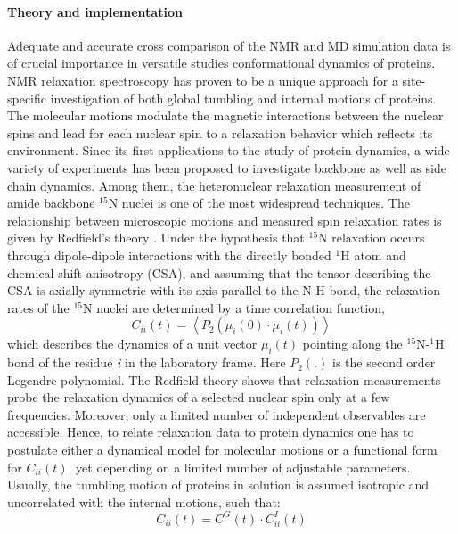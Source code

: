 \documentclass[a4paper,11pt]{article}
\begin{document}
\paragraph{Theory and implementation\\}
\label{op_theory}
Adequate and accurate cross comparison of the NMR and \gls{MD} simulation data is of crucial importance in versatile studies
conformational dynamics of proteins. NMR relaxation spectroscopy has proven to be a unique approach for a site-specific
investigation of both global tumbling and internal motions of proteins. The molecular motions modulate the magnetic 
interactions between the nuclear spins and lead for each nuclear spin to a relaxation behavior which reflects its environment. 
Since its first applications to the study of protein dynamics, a wide variety of experiments has been proposed to 
investigate backbone as well as side chain dynamics. Among them, the heteronuclear relaxation measurement of amide 
backbone $^{15}$N nuclei is one of the most widespread techniques. The relationship between microscopic motions and measured
spin relaxation rates is given by Redfield's theory \cite{Refield}. Under the hypothesis that $^{15}$N relaxation occurs through 
dipole-dipole interactions with the directly bonded $^{1}$H atom and chemical shift anisotropy (CSA), and assuming that the 
tensor describing the CSA is axially symmetric with its axis parallel to the N-H bond, the relaxation rates of the $^{15}$N 
nuclei are determined by a time correlation function,
\begin{equation}
\label{eq:op_cii}
C_{ii}(t) = \left\langle P_2(\mu_i(0) \cdot \mu_i(t)) \right\rangle
\end{equation}
which describes the dynamics of a unit vector $\mu_i(t)$ pointing along the $^{15}$N-$^{1}$H bond of the residue \textit{i} in the laboratory 
frame. Here $P_2(.)$ is the second order Legendre polynomial.
The Redfield theory shows that relaxation measurements probe the relaxation dynamics of a selected nuclear spin only at a 
few frequencies. Moreover, only a limited number of independent observables are accessible. Hence, to relate relaxation 
data to protein dynamics one has to postulate either a dynamical model for molecular motions or a functional form 
for $C_{ii}(t)$, yet depending on a limited number of adjustable parameters.
Usually, the tumbling motion of proteins in solution is assumed isotropic and uncorrelated with the internal motions, 
such that:
\begin{equation}
C_{ii}(t) = C^G(t) \cdot C^I_{ii}(t)
\end{equation}
\end{document}
